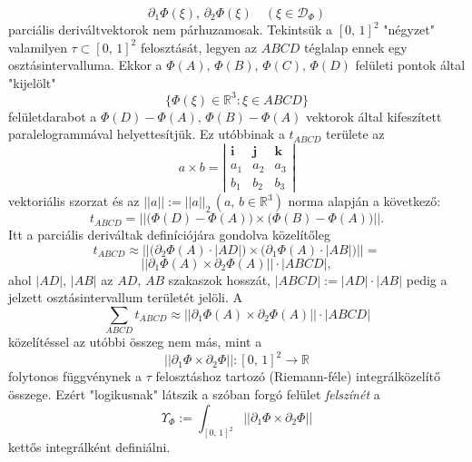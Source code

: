 \documentclass[12pt]{article}
\newcommand{\R}{\mathbb{R}}
\begin{document}
    \[
        \partial_1\Phi(\xi), \, \partial_2\Phi(\xi) \quad (\xi \in \mathcal{D}_\Phi)
    \]
    parciális deriváltvektorok nem párhuzamosak. Tekintsük a $[0, \, 1]^2$ "négyzet" valamilyen $\tau \subset [0, \, 1]^2$ felosztását, legyen az $ABCD$ téglalap ennek egy osztásintervalluma. Ekkor a $\Phi(A), \, \Phi(B), \, \Phi(C), \, \Phi(D)$ felületi pontok által "kijelölt"
    \[
        \{ \Phi(\xi) \in \R^3 : \xi \in ABCD \}
    \]
    felületdarabot a $\Phi(D) - \Phi(A), \, \Phi(B) - \Phi(A)$ vektorok által kifeszített paralelogrammával helyettesítjük. Ez utóbbinak a $t_{ABCD}$ területe az
    \[
        a \times b =
    \left|
        \begin{matrix}
            \mathbf{i} & \mathbf{j} & \mathbf{k} \\
            a_1 & a_2 & a_3 \\
            b_1 & b_2 & b_3
        \end{matrix}
    \right|
    \]
    vektoriális szorzat és az $||a|| := ||a||_2 \, (a, \, b \in \R^3)$ norma alapján a következő:
    \[
        t_{ABCD} = \Big| \Big| \big( \Phi(D) - \Phi(A) \big) \times \big( \Phi(B) - \Phi(A) \big) \Big| \Big|.
    \]
    Itt a parciális deriváltak definíciójára gondolva közelítőleg
    \[
        t_{ABCD} \approx \Big| \Big| \big( \partial_2 \Phi(A) \cdot |AD| \big) \times \big( \partial_1 \Phi(A) \cdot |AB| \big) \Big| \Big| =
    \]
    \[
        \big| \big| \partial_1 \Phi(A) \times \partial_2 \Phi(A) \big| \big| \cdot |ABCD|,
    \]
    ahol $|AD|, \, |AB|$ az $AD, \, AB$ szakaszok hosszát, $|ABCD| := |AD| \cdot |AB|$ pedig a jelzett osztásintervallum területét jelöli. A
    \[
        \sum_{ABCD} t_{ABCD} \approx \big| \big| \partial_1 \Phi(A) \times \partial_2 \Phi(A) \big| \big| \cdot |ABCD|
    \]
    közelítéssel az utóbbi összeg nem más, mint a
    \[
        \big| \big| \partial_1 \Phi \times \partial_2 \Phi \big| \big| : [0, \, 1]^2 \to \R
    \]
    folytonos függvénynek a $\tau$ felosztáshoz tartozó (Riemann-féle) integrálközelítő összege. Ezért "logikusnak" látszik a szóban forgó felület \textit{felszínét} a
    \[
        \Upsilon_\Phi := \int_{[0, \, 1]^2} || \partial_1 \Phi \times \partial_2 \Phi ||
    \]
    kettős integrálként definiálni.
\end{document}
